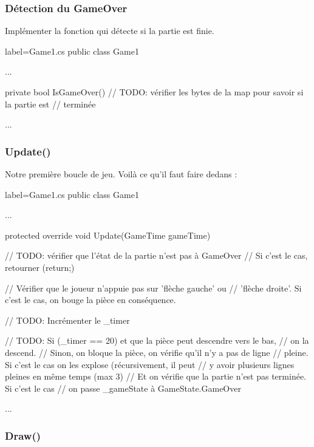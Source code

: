 \documentclass[a4paper]{article}
\begin{document}
\subsubsection{Détection du GameOver}

Implémenter la fonction qui détecte si la partie est finie. \\

\begin{csharpcode*}{label=Game1.cs}
public class Game1
{
    ...

    private bool IsGameOver()
    {
        // TODO: vérifier les bytes de la map pour savoir si la partie est
        //       terminée
    }
    
    ...
}
\end{csharpcode*}

\subsubsection{Update()}

Notre première boucle de jeu. Voilà ce qu'il faut faire dedans : \\

\begin{csharpcode*}{label=Game1.cs}
public class Game1
{
    ...

    protected override void Update(GameTime gameTime)
    {
        // TODO: vérifier que l'état de la partie n'est pas à GameOver
        //       Si c'est le cas, retourner (return;)

        // Vérifier que le joueur n'appuie pas sur 'flèche gauche' ou
        // 'flèche droite'. Si c'est le cas, on bouge la pièce en conséquence.

        // TODO: Incrémenter le _timer

        // TODO: Si (_timer == 20) et que la pièce peut descendre vers le bas,
        //          on la descend.
        //       Sinon, on bloque la pièce, on vérifie qu'il n'y a pas de ligne
        //          pleine. Si c'est le cas on les explose (récursivement, il peut
        //          y avoir plusieurs lignes pleines en même temps (max 3)
        //       Et on vérifie que la partie n'est pas terminée. Si c'est le cas
        //          on passe _gameState à GameState.GameOver
    }

    ...
}
\end{csharpcode*}

\subsubsection{Draw()}
\end{document}
